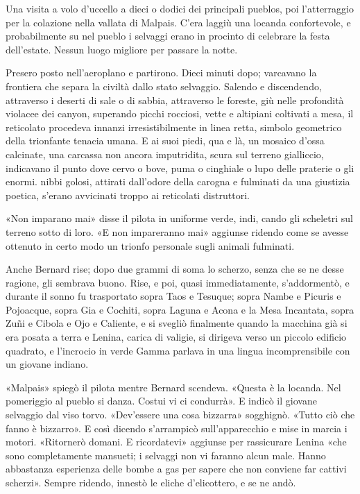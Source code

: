 \documentclass[
a5paper, %
10pt, %
twoside, 
onecolumn, %
openany, %
]{memoir}
\begin{document}
Una visita a volo d’uccello a dieci o dodici dei principali pueblos, poi l’atterraggio per la colazione nella vallata di Malpais. C’era laggiù una locanda confortevole, e probabilmente su nel pueblo i selvaggi erano in procinto di celebrare la festa dell’estate. Nessun luogo migliore per passare la notte.

Presero posto nell’aeroplano e partirono. Dieci minuti dopo; varcavano la frontiera che separa la civiltà dallo stato selvaggio. Salendo e discendendo, attraverso i deserti di sale o di sabbia, attraverso le foreste, giù nelle profondità violacee dei canyon, superando picchi rocciosi, vette e altipiani coltivati a mesa, il reticolato procedeva innanzi irresistibilmente in linea retta, simbolo geometrico della trionfante tenacia umana. E ai suoi piedi, qua e là, un mosaico d’ossa calcinate, una carcassa non ancora imputridita, scura sul terreno gialliccio, indicavano il punto dove cervo o bove, puma o cinghiale o lupo delle praterie o gli enormi. nibbi golosi, attirati dall’odore della carogna e fulminati da una giustizia poetica, s’erano avvicinati troppo ai reticolati distruttori.

«Non imparano mai» disse il pilota in uniforme verde, indi, cando gli scheletri sul terreno sotto di loro. «E non impareranno mai» aggiunse ridendo come se avesse ottenuto in certo modo un trionfo personale sugli animali fulminati.

Anche Bernard rise; dopo due grammi di soma lo scherzo, senza che se ne desse ragione, gli sembrava buono. Rise, e poi, quasi immediatamente, s’addormentò, e durante il sonno fu trasportato sopra Taos e Tesuque; sopra Nambe e Picuris e Pojoacque, sopra Gia e Cochiti, sopra Laguna e Acona e la Mesa Incantata, sopra Zuñi e Cibola e Ojo e Caliente, e si svegliò finalmente quando la macchina già si era posata a terra e Lenina, carica di valigie, si dirigeva verso un piccolo edificio quadrato, e l’incrocio in verde Gamma parlava in una lingua incomprensibile con un giovane indiano.

«Malpais» spiegò il pilota mentre Bernard scendeva. «Questa è la locanda. Nel pomeriggio al pueblo si danza. Costui vi ci condurrà». E indicò il giovane selvaggio dal viso torvo. «Dev’essere una cosa bizzarra» sogghignò. «Tutto ciò che fanno è bizzarro». E così dicendo s’arrampicò sull’apparecchio e mise in marcia i motori. «Ritornerò domani. E ricordatevi» aggiunse per rassicurare Lenina «che sono completamente mansueti; i selvaggi non vi faranno alcun male. Hanno abbastanza esperienza delle bombe a gas per sapere che non conviene far cattivi scherzi». Sempre ridendo, innestò le eliche d’elicottero, e se ne andò.
\end{document}
